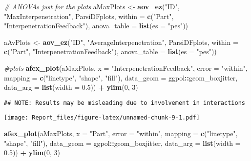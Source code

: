 \documentclass[
]{article}
\newenvironment{Shaded}{\begin{snugshade}}{\end{snugshade}}
\newcommand{\CommentTok}[1]{\textcolor[rgb]{0.56,0.35,0.01}{\textit{#1}}}
\newcommand{\DataTypeTok}[1]{\textcolor[rgb]{0.13,0.29,0.53}{#1}}
\newcommand{\DecValTok}[1]{\textcolor[rgb]{0.00,0.00,0.81}{#1}}
\newcommand{\FloatTok}[1]{\textcolor[rgb]{0.00,0.00,0.81}{#1}}
\newcommand{\KeywordTok}[1]{\textcolor[rgb]{0.13,0.29,0.53}{\textbf{#1}}}
\newcommand{\NormalTok}[1]{#1}
\newcommand{\OperatorTok}[1]{\textcolor[rgb]{0.81,0.36,0.00}{\textbf{#1}}}
\newcommand{\StringTok}[1]{\textcolor[rgb]{0.31,0.60,0.02}{#1}}
\begin{document}
\begin{Shaded}
\begin{Highlighting}[]
\CommentTok{# ANOVAs just for the plots}
\NormalTok{aMaxPlots <-}\StringTok{ }\KeywordTok{aov_ez}\NormalTok{(}\StringTok{"ID"}\NormalTok{, }\StringTok{"MaxInterpenetration"}\NormalTok{, ParsiDFplots,}
             \DataTypeTok{within =} \KeywordTok{c}\NormalTok{(}\StringTok{"Part"}\NormalTok{, }\StringTok{"InterpenetrationFeedback"}\NormalTok{),}
             \DataTypeTok{anova_table =} \KeywordTok{list}\NormalTok{(}\DataTypeTok{es =} \StringTok{"pes"}\NormalTok{))}

\NormalTok{aAvPlots <-}\StringTok{ }\KeywordTok{aov_ez}\NormalTok{(}\StringTok{"ID"}\NormalTok{, }\StringTok{"AverageInterpenetration"}\NormalTok{, ParsiDFplots,}
             \DataTypeTok{within =} \KeywordTok{c}\NormalTok{(}\StringTok{"Part"}\NormalTok{, }\StringTok{"InterpenetrationFeedback"}\NormalTok{),}
             \DataTypeTok{anova_table =} \KeywordTok{list}\NormalTok{(}\DataTypeTok{es =} \StringTok{"pes"}\NormalTok{))}

\CommentTok{#plots}
\KeywordTok{afex_plot}\NormalTok{(aMaxPlots, }\DataTypeTok{x =} \StringTok{"InterpenetrationFeedback"}\NormalTok{, }\DataTypeTok{error =} \StringTok{"within"}\NormalTok{, }
                \DataTypeTok{mapping =} \KeywordTok{c}\NormalTok{(}\StringTok{"linetype"}\NormalTok{, }\StringTok{"shape"}\NormalTok{, }\StringTok{"fill"}\NormalTok{),}
                \DataTypeTok{data_geom =}\NormalTok{ ggpol}\OperatorTok{::}\NormalTok{geom_boxjitter, }
                \DataTypeTok{data_arg =} \KeywordTok{list}\NormalTok{(}\DataTypeTok{width =} \FloatTok{0.5}\NormalTok{)) }\OperatorTok{+}
\StringTok{            }\KeywordTok{ylim}\NormalTok{(}\DecValTok{0}\NormalTok{, }\DecValTok{3}\NormalTok{)}
\end{Highlighting}
\end{Shaded}

\begin{verbatim}
## NOTE: Results may be misleading due to involvement in interactions
\end{verbatim}

\texttt{[image: Report\_files/figure-latex/unnamed-chunk-9-1.pdf]}

\begin{Shaded}
\begin{Highlighting}[]
\KeywordTok{afex_plot}\NormalTok{(aMaxPlots, }\DataTypeTok{x =} \StringTok{"Part"}\NormalTok{, }\DataTypeTok{error =} \StringTok{"within"}\NormalTok{, }
                \DataTypeTok{mapping =} \KeywordTok{c}\NormalTok{(}\StringTok{"linetype"}\NormalTok{, }\StringTok{"shape"}\NormalTok{, }\StringTok{"fill"}\NormalTok{),}
                \DataTypeTok{data_geom =}\NormalTok{ ggpol}\OperatorTok{::}\NormalTok{geom_boxjitter, }
                \DataTypeTok{data_arg =} \KeywordTok{list}\NormalTok{(}\DataTypeTok{width =} \FloatTok{0.5}\NormalTok{))  }\OperatorTok{+}
\StringTok{            }\KeywordTok{ylim}\NormalTok{(}\DecValTok{0}\NormalTok{, }\DecValTok{3}\NormalTok{)}
\end{Highlighting}
\end{Shaded}
\end{document}
